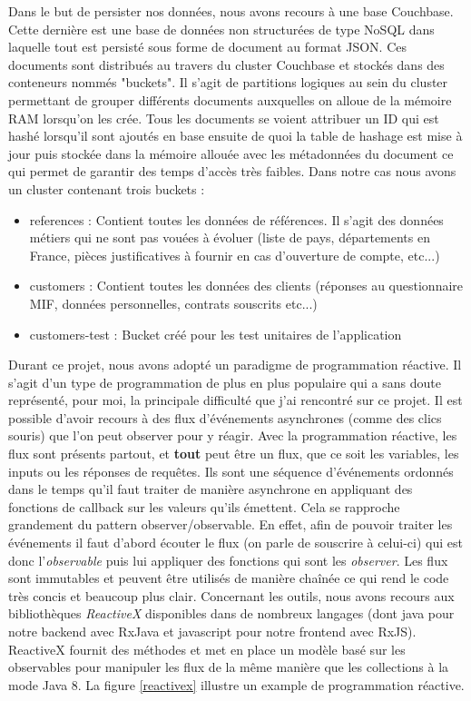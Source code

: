 	Dans le but de persister nos données, nous avons recours à une base Couchbase. Cette dernière est une base de données non structurées de type NoSQL dans laquelle tout est persisté sous forme de document au format JSON. Ces documents sont distribués au travers du cluster Couchbase et stockés dans des conteneurs nommés "buckets". Il s'agit de partitions logiques au sein du cluster permettant de grouper différents documents auxquelles on alloue de la mémoire RAM lorsqu'on les crée. Tous les documents se voient attribuer un ID qui est hashé lorsqu'il sont ajoutés en base ensuite de quoi la table de hashage est mise à jour puis stockée dans la mémoire allouée avec les métadonnées du document ce qui permet de garantir des temps d'accès très faibles. Dans notre cas nous avons un cluster contenant trois buckets :
	\begin{itemize}
		\item references : Contient toutes les données de références. Il s'agit des données métiers qui ne sont pas vouées à évoluer (liste de pays, départements en France, pièces justificatives à fournir en cas d'ouverture de compte, etc...)
		\item customers : Contient toutes les données des clients (réponses au questionnaire MIF, données personnelles, contrats souscrits etc...)
		\item customers-test : Bucket créé pour les test unitaires de l'application \\
	\end{itemize}
	
	Durant ce projet, nous avons adopté un paradigme de programmation réactive. Il s'agit d'un type de programmation de plus en plus populaire qui a sans doute représenté, pour moi, la principale difficulté que j'ai rencontré sur ce projet. Il est possible d'avoir recours à des flux d'événements asynchrones (comme des clics souris) que l'on peut observer pour y réagir. Avec la programmation réactive, les flux sont présents partout, et \textbf{tout} peut être un flux, que ce soit les variables, les inputs ou les réponses de requêtes. Ils sont une séquence d'événements ordonnés dans le temps qu'il faut traiter de manière asynchrone en appliquant des fonctions de callback sur les valeurs qu'ils émettent. Cela se rapproche grandement du pattern observer/observable. En effet, afin de pouvoir traiter les événements il faut d'abord écouter le flux (on parle de souscrire à celui-ci) qui est donc l'\textit{observable} puis lui appliquer des fonctions qui sont les \textit{observer}. Les flux sont immutables et peuvent être utilisés de manière chaînée ce qui rend le code très concis et beaucoup plus clair. Concernant les outils, nous avons recours aux bibliothèques \textit{ReactiveX} disponibles dans de nombreux langages (dont java pour notre backend avec RxJava et javascript pour notre frontend avec RxJS). ReactiveX fournit des méthodes et met en place un modèle basé sur les observables pour manipuler les flux de la même manière que les collections à la mode Java 8. La figure \ref{reactivex} illustre un example de programmation réactive.
	
